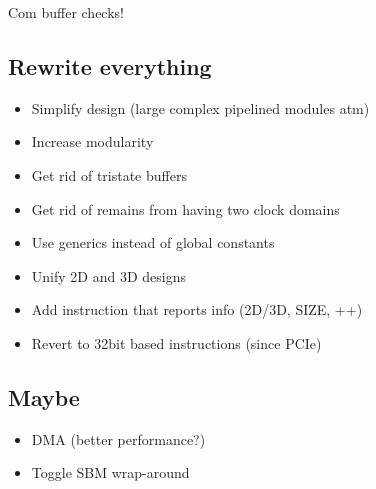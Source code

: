 \TODO Com buffer checks!

\subsection{Rewrite everything}

\begin{itemize}
    \item Simplify design (large complex pipelined modules atm)
    \item Increase modularity
    \item Get rid of tristate buffers
    \item Get rid of remains from having two clock domains
    \item Use generics instead of global constants
    \item Unify 2D and 3D designs
    \item Add instruction that reports info (2D/3D, SIZE, ++)
    \item Revert to 32bit based instructions (since PCIe)
\end{itemize}

\subsection{Maybe}

\begin{itemize}
    \item DMA (better performance?)
    \item Toggle SBM wrap-around
\end{itemize}

